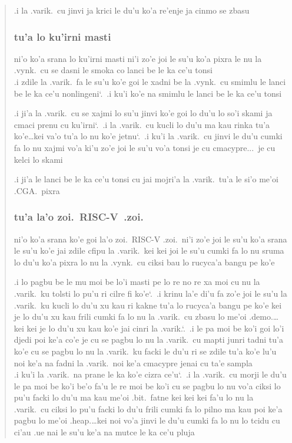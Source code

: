 \documentclass{report}
\newcommand\sds{\spacefactor\sfcode`.\ \space}
\begin{document}
\begin{quote}
	.i la .varik.\ cu jinvi ja krici le du'u ko'a re'enje ja cinmo se zbasu

	\subsubsection{tu'a lo ku'irni masti}
	ni'o ko'a srana lo ku'irni masti ni'i zo'e joi le su'u ko'a pixra le nu la .vynk.\ cu se dasni le smoka co lanci be le ka ce'u tonsi \\
	.i zdile la .varik.\ fa le su'u ko'e goi le xadni be la .vynk.\ cu smimlu le lanci be le ka ce'u nonlingeni\sds  .i ku'i ko'e na smimlu le lanci be le ka ce'u tonsi

	.i ji'a la .varik.\ cu se xajmi lo su'u jinvi ko'e goi lo du'u lo so'i skami ja cmaci prenu cu ku'irni\sds  .i la .varik.\ cu kucli lo du'u ma kau rinka tu'a ko'e\ldots kei va'o tu'a lo nu ko'e jetnu\sds  .i ku'i la .varik.\ cu jinvi le du'u cumki fa lo nu xajmi vo'a ki'u zo'e joi le su'u vo'a tonsi je cu cmacypre...\ je cu kelci lo skami

	.i ji'a le lanci be le ka ce'u tonsi cu jai mojri'a la .varik.\ tu'a le si'o me'oi .CGA.\ pixra

	\subsubsection{tu'a la'o zoi.\ RISC-V\ .zoi.}
	ni'o ko'a srana ko'e goi la'o zoi.\ RISC-V .zoi.\ ni'i zo'e joi le su'u ko'a srana le su'u ko'e jai zdile cfipu la .varik.\ kei kei joi le su'u cumki fa lo nu sruma lo du'u ko'a pixra lo nu la .vynk.\ cu ciksi bau lo rucyca'a bangu pe ko'e

	.i lo pagbu be le mu moi be lo'i masti pe lo re no re xa moi cu nu la .varik.\ ku tolsti lo pu'u ri cilre fi ko'e\sds  .i krinu la'e di'u fa zo'e joi le su'u la .varik.\ ku kucli lo du'u xu kau ri kakne tu'a lo rucyca'a bangu pe ko'e kei je lo du'u xu kau frili cumki fa lo nu la .varik.\ cu zbasu lo me'oi .demo.\ldots kei kei je lo du'u xu kau ko'e jai cinri la .varik.\sds  .i le pa moi be ko'i goi lo'i djedi poi ke'a co'e je cu se pagbu lo nu la .varik.\ cu mapti junri tadni tu'a ko'e cu se pagbu lo nu la .varik.\ ku facki le du'u ri se zdile tu'a ko'e lu'u noi ke'a na fadni la .varik.\ noi ke'a cmacypre jenai cu ta'e sampla  \\
	.i ku'i la .varik.\ na prane le ka ko'e cizra ce'u\sds  .i la .varik.\ cu morji le du'u le pa moi be ko'i be'o fa'u le re moi be ko'i cu se pagbu lo nu vo'a ciksi lo pu'u facki lo du'u ma kau me'oi .bit.\ fatne kei kei kei fa'u lo nu la .varik.\ cu ciksi lo pu'u facki lo du'u frili cumki fa lo pilno ma kau poi ke'a pagbu lo me'oi .heap.\ldots kei noi vo'a jinvi le du'u cumki fa lo nu lo tcidu cu ci'au .ue nai le su'u ke'a na mutce le ka ce'u pluja


\end{quote}
\end{document}
